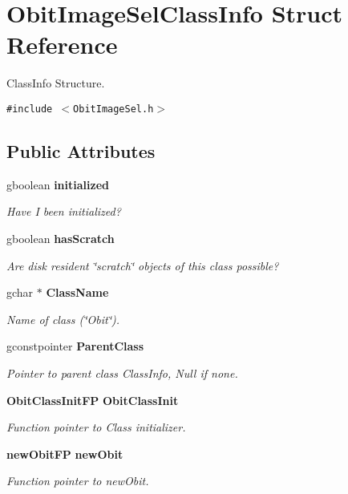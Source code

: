 \section{Obit\-Image\-Sel\-Class\-Info Struct Reference}
\label{structObitImageSelClassInfo}
Class\-Info Structure.  


{\tt \#include $<$Obit\-Image\-Sel.h$>$}

\subsection*{Public Attributes}
\begin{CompactItemize}
\item 
gboolean {\bf initialized}
\begin{CompactList}\small\item\em Have I been initialized? \item\end{CompactList}\item 
gboolean {\bf has\-Scratch}
\begin{CompactList}\small\item\em Are disk resident \char`\"{}scratch\char`\"{} objects of this class possible? \item\end{CompactList}\item 
gchar $\ast$ {\bf Class\-Name}
\begin{CompactList}\small\item\em Name of class (\char`\"{}Obit\char`\"{}). \item\end{CompactList}\item 
gconstpointer {\bf Parent\-Class}
\begin{CompactList}\small\item\em Pointer to parent class Class\-Info, Null if none. \item\end{CompactList}\item 
{\bf Obit\-Class\-Init\-FP} {\bf Obit\-Class\-Init}
\begin{CompactList}\small\item\em Function pointer to Class initializer. \item\end{CompactList}\item 
{\bf new\-Obit\-FP} {\bf new\-Obit}
\begin{CompactList}\small\item\em Function pointer to new\-Obit. \item\end{CompactList}\item 

\end{CompactItemize}
